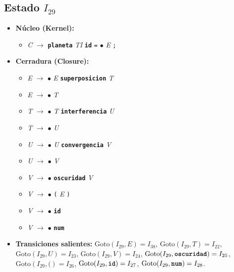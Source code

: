 \documentclass[12pt, letterpaper]{article}
\begin{document}
\subsection*{Estado $I_{29}$ }
\begin{itemize}\setlength{\itemsep}{1pt}\setlength{\parskip}{0pt}
\item \textbf{Núcleo (Kernel):}
\begin{itemize}\setlength{\itemsep}{1pt}\setlength{\parskip}{0pt}
    \item \textit{C} $\to$ \textbf{\texttt{planeta}} \textit{TI} \textbf{\texttt{id}} \texttt{=} $\bullet$ \textit{E} \texttt{;}
\end{itemize}
\item \textbf{Cerradura (Closure):}
\begin{itemize}\setlength{\itemsep}{1pt}\setlength{\parskip}{0pt}
    \item \textit{E} $\to$ $\bullet$ \textit{E} \textbf{\texttt{superposicion}} \textit{T}
    \item \textit{E} $\to$ $\bullet$ \textit{T}
    \item \textit{T} $\to$ $\bullet$ \textit{T} \textbf{\texttt{interferencia}} \textit{U}
    \item \textit{T} $\to$ $\bullet$ \textit{U}
    \item \textit{U} $\to$ $\bullet$ \textit{U} \textbf{\texttt{convergencia}} \textit{V}
    \item \textit{U} $\to$ $\bullet$ \textit{V}
    \item \textit{V} $\to$ $\bullet$ \textbf{\texttt{oscuridad}} \textit{V}
    \item \textit{V} $\to$ $\bullet$ \texttt{(} \textit{E} \texttt{)}
    \item \textit{V} $\to$ $\bullet$ \textbf{\texttt{id}}
    \item \textit{V} $\to$ $\bullet$ \textbf{\texttt{num}}
\end{itemize}
\item \textbf{Transiciones salientes:} $\text{Goto}(I_{29}, \textit{E}) = I_{38}$, \quad $\text{Goto}(I_{29}, \textit{T}) = I_{22}$, \quad $\text{Goto}(I_{29}, \textit{U}) = I_{23}$, \quad $\text{Goto}(I_{29}, \textit{V}) = I_{24}$, \quad $\text{Goto}(I_{29}, \textbf{\texttt{oscuridad}}) = I_{25}$, \quad $\text{Goto}(I_{29}, \texttt{(}) = I_{26}$, \quad $\text{Goto}(I_{29}, \textbf{\texttt{id}}) = I_{27}$, \quad $\text{Goto}(I_{29}, \textbf{\texttt{num}}) = I_{28}$.
\end{itemize}
\vspace{2pt}
\end{document}
